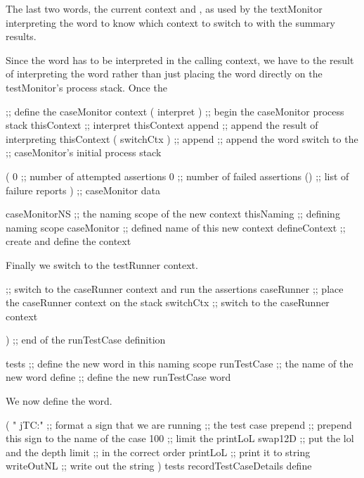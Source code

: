 The last two words, the current context and , as used by the 
textMonitor interpreting the  word to know which context to 
switch to with the summary results. 

Since the  word has to be interpreted in the calling 
context, we have to  the result of interpreting the 
 word rather than just placing the  
word directly on the testMonitor's process stack. Once the 

\startJoylolCode
  ;; define the caseMonitor context
  ( interpret ) ;; begin the caseMonitor process stack
  thisContext   ;; interpret thisContext 
  append        ;; append the result of interpreting thisContext
  ( switchCtx ) ;; 
  append        ;; append the word switch to the
                ;; caseMonitor's initial process stack
  
  ( 
    0           ;; number of attempted assertions
    0           ;; number of failed assertions
    ()          ;; list of failure reports
  )             ;; caseMonitor data

  caseMonitorNS ;; the naming scope of the new context
  thisNaming    ;; defining naming scope
  caseMonitor   ;; defined name of this new context
  defineContext ;; create and define the context
\stopJoylolCode

Finally we switch to the testRunner context.

\startJoylolCode
  ;; switch to the caseRunner context and run the assertions
  caseRunner ;; place the caseRunner context on the stack
  switchCtx  ;; switch to the caseRunner context
  
)            ;; end of the runTestCase definition

tests        ;; define the new word in this naming scope
runTestCase  ;; the name of the new word
define       ;; define the new runTestCase word
\stopJoylolCode

We now define the  word.

\startJoylolCode
(
  "  jTC:"    ;; format a sign that we are running
              ;; the test case
  prepend     ;; prepend this sign to the name of the case
  100         ;; limit the printLoL
  swap12D     ;; put the lol and the depth limit
              ;; in the correct order
  printLoL    ;; print it to string
  writeOutNL  ;; write out the string
)
tests
recordTestCaseDetails
define
\stopJoylolCode
\stopTestSuite


